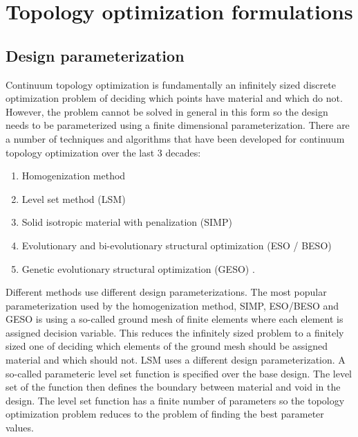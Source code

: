 \newpage
\section{Topology optimization formulations}

\subsection{Design parameterization}

Continuum topology optimization is fundamentally an infinitely sized discrete optimization problem of deciding which points have material and which do not. However, the problem cannot be solved in general in this form so the design needs to be parameterized using a finite dimensional parameterization. There are a number of techniques and algorithms that have been developed for continuum topology optimization over the last 3 decades:
\begin{enumerate}
    \item Homogenization method \citep{Bendsoe1988}
    \item Level set method (LSM) \citep{Osher1988, Allaire2002, Wang2003, Wang2004, Guirguis2016}
    \item Solid isotropic material with penalization (SIMP) \citep{Bendsoe1989,Sigmund2001,Rojas-Labanda2015}
    \item Evolutionary and bi-evolutionary structural optimization (ESO / BESO) \citep{YM1992,XY1998,Huang2010a}
    \item Genetic evolutionary structural optimization (GESO) \citep{Sandgren1990a, Liu2008}. 
\end{enumerate}

Different methods use different design parameterizations. The most popular parameterization used by the homogenization method, SIMP, ESO/BESO and GESO is using a so-called ground mesh of finite elements where each element is assigned decision variable. This reduces the infinitely sized problem to a finitely sized one of deciding which elements of the ground mesh should be assigned material and which should not. LSM uses a different design parameterization. A so-called parameteric level set function is specified over the base design. The level set of the function then defines the boundary between material and void in the design. The level set function has a finite number of parameters so the topology optimization problem reduces to the problem of finding the best parameter values.

